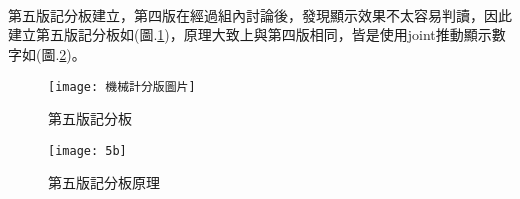 \\
\\
\\
第五版記分板建立，第四版在經過組內討論後，發現顯示效果不太容易判讀，因此建立第五版記分板如(圖.\ref{第五版記分板})，原理大致上與第四版相同，皆是使用joint推動顯示數字如(圖.\ref{第五版記分板原理})。
\begin{figure}[hbt!]
\begin{center}
\texttt{[image: 機械計分版圖片]}
\caption{\Large 第五版記分板}\label{第五版記分板}
\end{center}
\end{figure}
\begin{figure}[hbt!]
\begin{center}
\newpage
\texttt{[image: 5b]}
\caption{\Large 第五版記分板原理}\label{第五版記分板原理}
\end{center}
\end{figure}\\